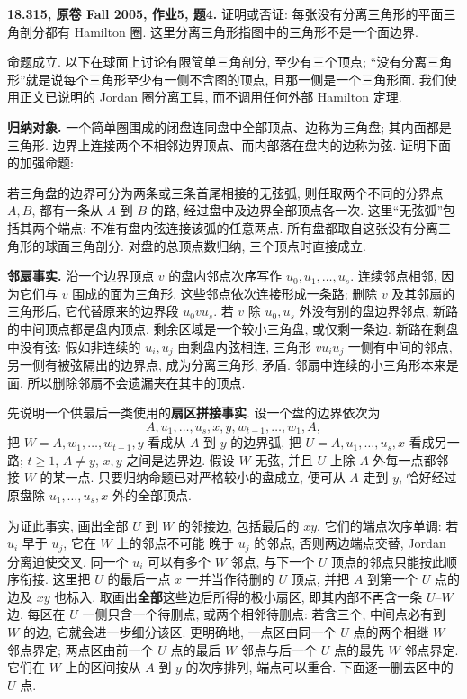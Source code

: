 \begin{exercise}\label{mit:18315-hw5-q4}
\textbf{18.315, 原卷 Fall 2005, 作业5, 题4.}
证明或否证: 每张没有分离三角形的平面三角剖分都有 Hamilton 圈.
这里分离三角形指图中的三角形不是一个面边界.
\end{exercise}
\begin{solution}
命题成立. 以下在球面上讨论有限简单三角剖分, 至少有三个顶点;
“没有分离三角形”就是说每个三角形至少有一侧不含图的顶点,
且那一侧是一个三角形面. 我们使用正文已说明的 Jordan 圈分离工具,
而不调用任何外部 Hamilton 定理.

\textbf{归纳对象.}
一个简单圈围成的闭盘连同盘中全部顶点、边称为三角盘;
其内面都是三角形. 边界上连接两个不相邻边界顶点、而内部落在盘内的边称为弦.
证明下面的加强命题:

若三角盘的边界可分为两条或三条首尾相接的无弦弧,
则任取两个不同的分界点 $A,B$, 都有一条从 $A$ 到 $B$ 的路,
经过盘中及边界全部顶点各一次.
这里“无弦弧”包括其两个端点: 不准有盘内弦连接该弧的任意两点.
所有盘都取自这张没有分离三角形的球面三角剖分.
对盘的总顶点数归纳, 三个顶点时直接成立.

\textbf{邻扇事实.}
沿一个边界顶点 $v$ 的盘内邻点次序写作 $u_0,u_1,\ldots,u_s$.
连续邻点相邻, 因为它们与 $v$ 围成的面为三角形.
这些邻点依次连接形成一条路; 删除 $v$ 及其邻扇的三角形后,
它代替原来的边界段 $u_0vu_s$.
若 $v$ 除 $u_0,u_s$ 外没有别的盘边界邻点, 新路的中间顶点都是盘内顶点,
剩余区域是一个较小三角盘, 或仅剩一条边.
新路在剩盘中没有弦: 假如非连续的 $u_i,u_j$ 由剩盘内弦相连,
三角形 $vu_iu_j$ 一侧有中间的邻点, 另一侧有被弦隔出的边界点,
成为分离三角形, 矛盾.
邻扇中连续的小三角形本来是面, 所以删除邻扇不会遗漏夹在其中的顶点.

先说明一个供最后一类使用的\textbf{扇区拼接事实}.
设一个盘的边界依次为
\[
A,u_1,\ldots,u_s,x,y,w_{t-1},\ldots,w_1,A,
\]
把 $W=A,w_1,\ldots,w_{t-1},y$ 看成从 $A$ 到 $y$ 的边界弧,
把 $U=A,u_1,\ldots,u_s,x$ 看成另一路; $t\ge1$, $A\ne y$,
$x,y$ 之间是边界边.
假设 $W$ 无弦, 并且 $U$ 上除 $A$ 外每一点都邻接 $W$ 的某一点.
只要归纳命题已对严格较小的盘成立,
便可从 $A$ 走到 $y$, 恰好经过原盘除 $u_1,\ldots,u_s,x$ 外的全部顶点.

为证此事实, 画出全部 $U$ 到 $W$ 的邻接边, 包括最后的 $xy$.
它们的端点次序单调: 若 $u_i$ 早于 $u_j$, 它在 $W$ 上的邻点不可能
晚于 $u_j$ 的邻点, 否则两边端点交替, Jordan 分离迫使交叉.
同一个 $u_i$ 可以有多个 $W$ 邻点, 与下一个 $U$ 顶点的邻点只能按此顺序衔接.
这里把 $U$ 的最后一点 $x$ 一并当作待删的 $U$ 顶点,
并把 $A$ 到第一个 $U$ 点的边及 $xy$ 也标入.
取画出\textbf{全部}这些边后所得的极小扇区, 即其内部不再含一条 $U$--$W$ 边.
每区在 $U$ 一侧只含一个待删点, 或两个相邻待删点:
若含三个, 中间点必有到 $W$ 的边, 它就会进一步细分该区.
更明确地, 一点区由同一个 $U$ 点的两个相继 $W$ 邻点界定;
两点区由前一个 $U$ 点的最后 $W$ 邻点与后一个 $U$ 点的最先 $W$ 邻点界定.
它们在 $W$ 上的区间按从 $A$ 到 $y$ 的次序排列, 端点可以重合.
下面逐一删去区中的 $U$ 点.


\end{solution}
